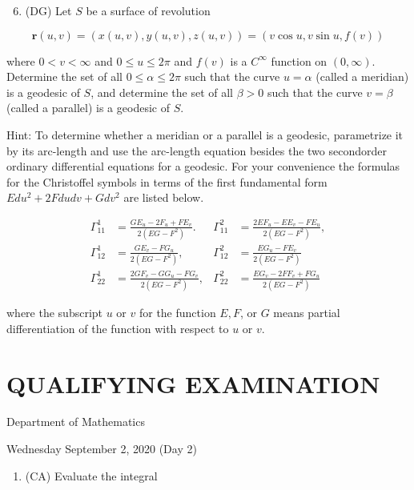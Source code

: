 \documentclass[10pt]{article}
\begin{document}
\begin{enumerate}
  \setcounter{enumi}{5}
  \item (DG) Let $S$ be a surface of revolution
\end{enumerate}

$$
\mathbf{r}(u, v)=(x(u, v), y(u, v), z(u, v))=(v \cos u, v \sin u, f(v))
$$

where $0<v<\infty$ and $0 \leq u \leq 2 \pi$ and $f(v)$ is a $C^{\infty}$ function on $(0, \infty)$. Determine the set of all $0 \leq \alpha \leq 2 \pi$ such that the curve $u=\alpha$ (called a meridian) is a geodesic of $S$, and determine the set of all $\beta>0$ such that the curve $v=\beta$ (called a parallel) is a geodesic of $S$.

Hint: To determine whether a meridian or a parallel is a geodesic, parametrize it by its arc-length and use the arc-length equation besides the two secondorder ordinary differential equations for a geodesic. For your convenience the formulas for the Christoffel symbols in terms of the first fundamental form $E d u^{2}+2 F d u d v+G d v^{2}$ are listed below.

$$
\begin{aligned}
\Gamma_{11}^{1} & =\frac{G E_{u}-2 F_{u}+F E_{v}}{2\left(E G-F^{2}\right)} . & \Gamma_{11}^{2} & =\frac{2 E F_{u}-E E_{v}-F E_{u}}{2\left(E G-F^{2}\right)}, \\
\Gamma_{12}^{1} & =\frac{G E_{v}-F G_{u}}{2\left(E G-F^{2}\right)}, & \Gamma_{12}^{2} & =\frac{E G_{u}-F E_{v}}{2\left(E G-F^{2}\right)} \\
\Gamma_{22}^{1} & =\frac{2 G F_{v}-G G_{u}-F G_{v}}{2\left(E G-F^{2}\right)}, & \Gamma_{22}^{2} & =\frac{E G_{v}-2 F F_{v}+F G_{u}}{2\left(E G-F^{2}\right)}
\end{aligned}
$$

where the subscript $u$ or $v$ for the function $E, F$, or $G$ means partial differentiation of the function with respect to $u$ or $v$.

\section*{QUALIFYING EXAMINATION }
Department of Mathematics

Wednesday September 2, 2020 (Day 2)

\begin{enumerate}
  \item (CA) Evaluate the integral
\end{enumerate}
\end{document}
